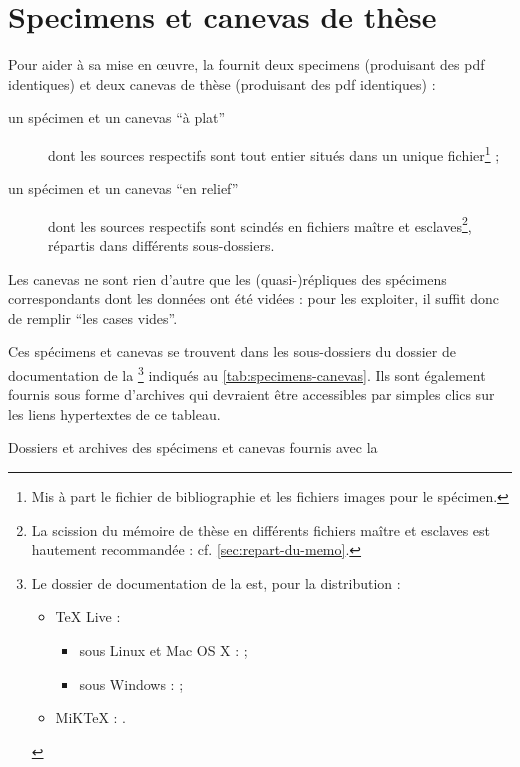 \chapter{Specimens et canevas de thèse}\label{cha:specimen-canevas}%

Pour aider à sa mise en œuvre, la \yatcl fournit deux specimens (produisant
des \gls{pdf} identiques) et deux canevas de thèse (produisant des \gls{pdf}
identiques) :
\begin{description}
\item[un spécimen et un canevas \enquote{à plat}] dont les sources 
  respectifs sont tout entier situés dans un unique fichier\footnote{Mis à part
    le fichier de bibliographie et les fichiers images pour le spécimen.} ;
\item[un spécimen et un canevas \enquote{en relief}] dont les sources
   respectifs sont scindés en fichiers maître et
  esclaves\footnote{La scission du mémoire de thèse en différents fichiers
    maître et esclaves est hautement recommandée :
    cf. \vref{sec:repart-du-memo}.}, répartis dans différents sous-dossiers.
\end{description}
Les canevas ne sont rien d'autre que les (quasi-)répliques des spécimens
correspondants dont les données ont été vidées : pour les exploiter, il suffit
donc de remplir \enquote{les cases vides}.

Ces spécimens et canevas se trouvent dans les sous-dossiers du dossier de
documentation de la \yatcl{}\footnote{Le dossier de documentation de la
  \yatcl{} est, pour la distribution :
  \begin{itemize}
  \item \TeX{} Live :
    \begin{itemize}
    \item sous Linux et Mac OS X :
      \unixtldirectory\tldistdirectory\jobdocdirectory{} ;
    \item sous Windows :
      \wintldirectory\tldistdirectory\jobdocdirectory{} ;
    \end{itemize}
  \item MiK\TeX{} : \miktexdistdirectory.
  \end{itemize}
  \label{fn:yathesisdocfolder}} indiqués au \vref{tab:specimens-canevas}. Ils
sont également fournis sous forme d'archives  qui devraient être
accessibles par simples clics sur les liens hypertextes de ce tableau.
\begin{table}
  \centering
  
  \caption{Dossiers et archives  des spécimens et canevas fournis
    avec la \yatcl{}}
  \label{tab:specimens-canevas}
\end{table}

